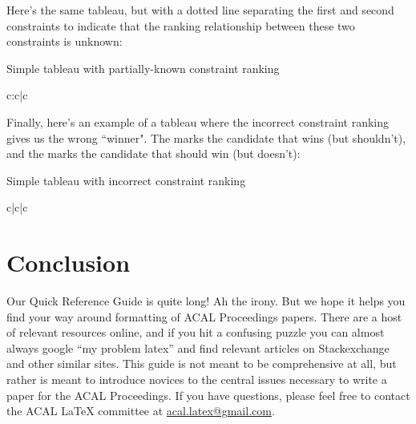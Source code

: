 \documentclass[output=paper,colorlinks,citecolor=brown,
]{langscibook}
\begin{document}

Here's the same tableau, but with a dotted line separating the first and second constraints to indicate that the ranking relationship between these two constraints is unknown:

\ea Simple tableau with partially-known constraint ranking

\begin{tableau}{c:c|c}
 \vio{*!} \vio{} \vio{} 
 \vio{} \vio{} \vio{*} 
 \vio{} \vio{*!} \vio{}
\end{tableau}
\z

Finally, here's an example of a tableau where the incorrect constraint ranking gives us the wrong ``winner". The \bomb{} marks the candidate that wins (but shouldn't), and the \grimace{} marks the candidate that should win (but doesn't):

\ea Simple tableau with incorrect constraint ranking

\ShadingOn
\begin{tableau}{c|c|c}
 \vio{*!} \vio{} \vio{} 
 \vio{} \vio{*!} \vio{} 
 \vio{} \vio{} \vio{*}
\end{tableau}
\z

\section{Conclusion}

Our Quick Reference Guide is quite long! Ah the irony. But we hope it helps you find your way around formatting of ACAL Proceedings papers. There are a host of relevant resources online, and if you hit a confusing puzzle you can almost always google ``my problem latex'' and find relevant articles on Stackexchange and other similar sites. This guide is not meant to be comprehensive at all, but rather is meant to introduce novices to the central issues necessary to write a paper for the ACAL Proceedings. If you have questions, please feel free to contact the ACAL \LaTeX{} committee at \href{mailto:acal.latex@gmail.com}{acal.latex@gmail.com}.
\end{document}
